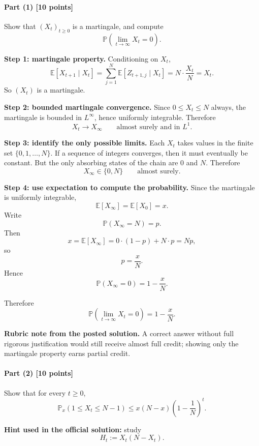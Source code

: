 \documentclass[11pt]{article}
\theoremstyle{definition}
\begin{document}
\paragraph{Part (1) \hfill [10 points]}
Show that \((X_t)_{t\ge 0}\) is a martingale, and compute
\[
\mathbb P\!\left(\lim_{t\to\infty}X_t=0\right).
\]

\textbf{Step 1: martingale property.}
Conditioning on \(X_t\),
\[
\mathbb E[X_{t+1}\mid X_t]
=
\sum_{j=1}^N \mathbb E[Z_{t+1,j}\mid X_t]
=
N\cdot \frac{X_t}{N}
=
X_t.
\]
So \((X_t)\) is a martingale.

\textbf{Step 2: bounded martingale convergence.}
Since \(0\le X_t\le N\) always, the martingale is bounded in \(L^\infty\), hence uniformly integrable. Therefore
\[
X_t\to X_\infty
\qquad \text{almost surely and in } L^1.
\]

\textbf{Step 3: identify the only possible limits.}
Each \(X_t\) takes values in the finite set \(\{0,1,\dots,N\}\). If a sequence of integers converges, then it must eventually be constant. But the only absorbing states of the chain are \(0\) and \(N\). Therefore
\[
X_\infty\in\{0,N\}
\qquad \text{almost surely.}
\]

\textbf{Step 4: use expectation to compute the probability.}
Since the martingale is uniformly integrable,
\[
\mathbb E[X_\infty]=\mathbb E[X_0]=x.
\]
Write
\[
\mathbb P(X_\infty=N)=p.
\]
Then
\[
x=\mathbb E[X_\infty]=0\cdot (1-p)+N\cdot p=Np,
\]
so
\[
p=\frac{x}{N}.
\]
Hence
\[
\mathbb P(X_\infty=0)=1-\frac{x}{N}.
\]

Therefore
\[
\boxed{\mathbb P\!\left(\lim_{t\to\infty}X_t=0\right)=1-\frac{x}{N}.}
\]

\textbf{Rubric note from the posted solution.}
A correct answer without full rigorous justification would still receive almost full credit; showing only the martingale property earns partial credit.

\paragraph{Part (2) \hfill [10 points]}
Show that for every \(t\ge 0\),
\[
\mathbb P_x(1\le X_t\le N-1)
\le
x(N-x)\left(1-\frac1N\right)^t.
\]

\textbf{Hint used in the official solution:} study
\[
H_t:=X_t(N-X_t).
\]
\end{document}
